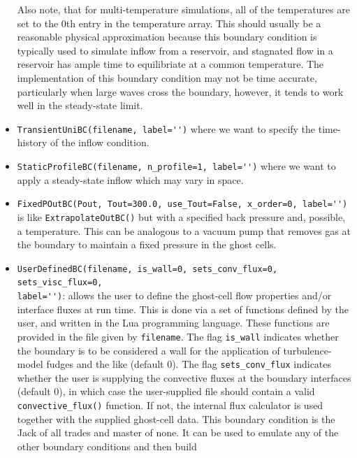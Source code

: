 \begin{itemize}
      Also note, that for multi-temperature simulations, all of the temperatures
      are set to the 0th entry in the temperature array. 
      This should usually be a reasonable physical approximation because this boundary condition
      is typically used to simulate inflow from a reservoir, and stagnated flow in a reservoir 
      has ample time to equilibriate at a common temperature.
      The implementation of this boundary condition may not be time accurate, 
      particularly when large waves cross the boundary, however, it tends to work well in the steady-state limit.
    \item \verb!TransientUniBC(filename, label='')! where we want to specify the time-history of
      the inflow condition.
    \item \verb!StaticProfileBC(filename, n_profile=1, label='')! where we want to apply a steady-state inflow
       which may vary in space.
    \item \verb!FixedPOutBC(Pout, Tout=300.0, use_Tout=False, x_order=0, label='')! \\
      is like \verb!ExtrapolateOutBC()! but with a specified back pressure and, possible, a temperature.
      This can be analogous to a vacuum pump that removes gas at the boundary to maintain
      a fixed pressure in the ghost cells.
    \item \verb!UserDefinedBC(filename, is_wall=0, sets_conv_flux=0, sets_visc_flux=0,!\\
          \verb!label='')!: 
       allows the user to define the ghost-cell flow properties and/or interface fluxes at run time.
       This is done via a set of functions defined by the user, and written in the Lua
       programming language.
       These functions are provided in the file given by \texttt{filename}.
       The flag \verb!is_wall! indicates whether the boundary is to be considered
       a wall for the application of turbulence-model fudges and the like (default 0).
       The flag \verb!sets_conv_flux! indicates whether the user is supplying
       the convective fluxes at the boundary interfaces (default 0), in which case the user-supplied file should
       contain a valid \verb!convective_flux()! function.  
       If not, the internal flux calculator is used together with the supplied ghost-cell data.
       This boundary condition is the Jack of all trades and master of none.
       It can be used to emulate any of the other boundary conditions and then build

\end{itemize}
